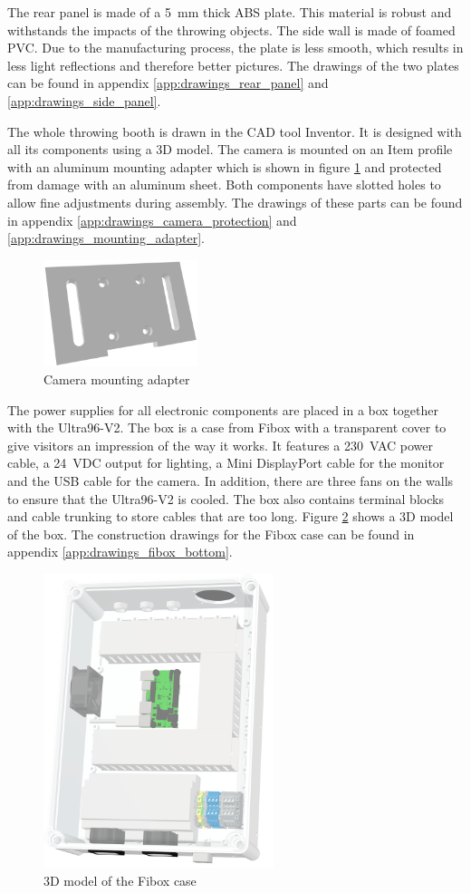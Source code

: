 The rear panel is made of a \SI{5}{mm} thick ABS plate.
This material is robust and withstands the impacts of the throwing objects.
The side wall is made of foamed PVC.
Due to the manufacturing process, the plate is less smooth, which results in less light reflections and therefore better pictures.
The drawings of the two plates can be found in appendix \ref{app:drawings_rear_panel} and \ref{app:drawings_side_panel}.

The whole throwing booth is drawn in the CAD tool Inventor. It is designed with all its components using a 3D model.
The camera is mounted on an Item profile with an aluminum mounting adapter which is shown in figure \ref{fig:mounting_adapter} and protected from damage with an aluminum sheet.
Both components have slotted holes to allow fine adjustments during assembly.
The drawings of these parts can be found in appendix \ref{app:drawings_camera_protection} and \ref{app:drawings_mounting_adapter}.

\begin{figure}[h]
	\centering
	\includegraphics[width=0.4\textwidth]{graphics/mounting_adapter.png}
	\caption{Camera mounting adapter}
	\label{fig:mounting_adapter}
\end{figure}
\clearpage
The power supplies for all electronic components are placed in a box together with the Ultra96-V2.
The box is a case from Fibox with a transparent cover to give visitors an impression of the way it works.
It features a \SI{230}{VAC} power cable, a \SI{24}{VDC} output for lighting, a Mini DisplayPort cable for the monitor and the USB cable for the camera.
In addition, there are three fans on the walls to ensure that the Ultra96-V2 is cooled.
The box also contains terminal blocks and cable trunking to store cables that are too long.
Figure \ref{fig:fibox3d} shows a 3D model of the box. The construction drawings for the Fibox case can be found in appendix \ref{app:drawings_fibox_bottom}.

\begin{figure}[h]
	\centering
	\includegraphics[width=0.6\textwidth]{graphics/case.png}
	\caption{3D model of the Fibox case}
	\label{fig:fibox3d}
\end{figure}
